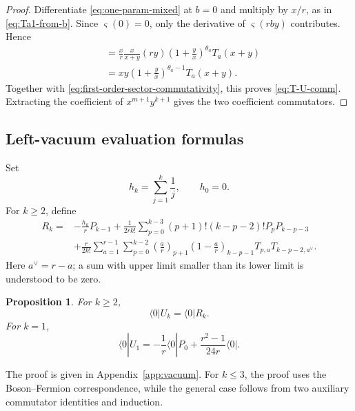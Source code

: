 \documentclass[letterpaper,12pt]{amsart}
\newtheorem{prop}[thm]{Proposition}
\theoremstyle{definition}
\newcommand{\vars}{\varsigma}
\numberwithin{equation}{section}
\begin{document}
\begin{proof}
Differentiate \eqref{eq:one-param-mixed} at \(b=0\) and multiply by \(x/r\),
as in \eqref{eq:Ta1-from-b}.  Since \(\vars(0)=0\), only the derivative of
\(\vars(rby)\) contributes.  Hence
\begin{align*}
  [P(y),T_a^{(1)}(x)]
  &=
  \frac{x}{r}\frac{x}{x+y}(ry)
  \left(1+\frac yx\right)^{\theta_a}T_a(x+y)\\
  &=
  xy\left(1+\frac yx\right)^{\theta_a-1}T_a(x+y).
\end{align*}
Together with \eqref{eq:first-order-sector-commutativity}, this proves
\eqref{eq:T-U-comm}.  Extracting the coefficient of
\(x^{m+1}y^{k+1}\) gives the two coefficient commutators.
\end{proof}

\subsection{Left-vacuum evaluation formulas}

Set
\begin{equation}\label{eq:harmonic}
  h_k=\sum_{j=1}^{k}\frac1j,
  \qquad h_0=0.
\end{equation}
For \(k\ge2\), define
\begin{equation}\label{eq:Rk-def}
  \begin{aligned}
    R_k={}&-\frac{h_k}{r}P_{k-1}
    +\frac1{2rk!}\sum_{p=0}^{k-3}(p+1)!(k-p-2)!P_pP_{k-p-3}
    \\
    &+\frac r{2k!}\sum_{a=1}^{r-1}
    \sum_{p=0}^{k-2}\left(\frac{a}{r}\right)_{p+1}
    \left(1-\frac{a}{r}\right)_{k-p-1}
    T_{p,a}T_{k-p-2,a^\vee}.
  \end{aligned}
\end{equation}
Here \(a^\vee=r-a\); a sum with upper limit smaller than its lower limit is
understood to be zero.


\begin{prop}\label{prop:vacuum-removal}
For \(k\ge2\), 
\[
  \langle0|U_k=\langle0|R_k.
\]
For \(k=1\),
\begin{equation}\label{eq:U1-vacuum}
    \langle0|U_1=-\frac1r\langle0|P_0+\frac{r^2-1}{24r}\langle0|.
\end{equation}
\end{prop}

The proof is given in Appendix~\ref{app:vacuum}.  For $k\leq 3$, the proof
uses the Boson--Fermion correspondence, while the general case
follows from two auxiliary commutator identities and induction.
\end{document}
